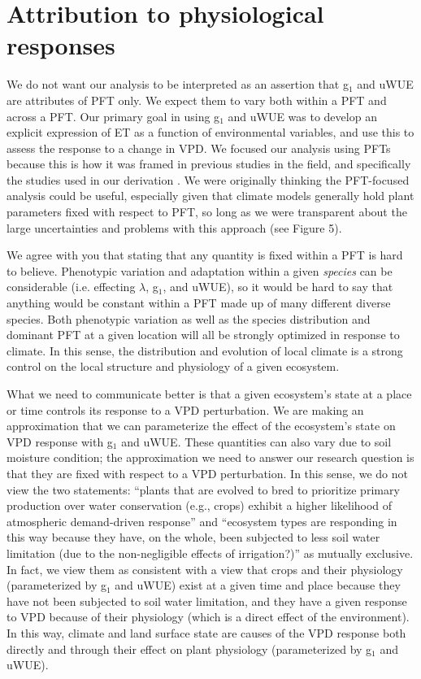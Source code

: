 \documentclass[12pt]{article}
\begin{document}
\section{Attribution to physiological responses}

We do not want our analysis to be interpreted as an assertion that
g$_1$ and uWUE are attributes of PFT only. We expect them to vary both
within a PFT and across a PFT. Our primary goal in using g$_1$ and
uWUE was to develop an explicit expression of ET as a function of
environmental variables, and use this to assess the response to a
change in VPD. We focused our analysis using PFTs because this is how
it was framed in previous studies in the field, and specifically the
studies used in our derivation \citep{Zhou_2014, Zhou_2015,
  Medlyn_2017}. We were originally thinking the PFT-focused analysis
could be useful, especially given that climate models generally hold
plant parameters fixed with respect to PFT, so long as we were
transparent about the large uncertainties and problems with this
approach (see Figure 5).

We agree with you that stating that any quantity is fixed within a PFT
is hard to believe. Phenotypic variation and adaptation within a given
\textit{species} can be considerable (i.e. effecting $\lambda$, g$_1$,
and uWUE), so it would be hard to say that anything would be constant
within a PFT made up of many different diverse species. Both
phenotypic variation as well as the species distribution and dominant
PFT at a given location will all be strongly optimized in response to
climate. In this sense, the distribution and evolution of local
climate is a strong control on the local structure and physiology of a
given ecosystem.

What we need to communicate better is that a given ecosystem's state
at a place or time controls its response to a VPD perturbation. We are
making an approximation that we can parameterize the effect of the
ecosystem's state on VPD response with g$_1$ and uWUE. These quantities
can also vary due to soil moisture condition; the approximation we
need to answer our research question is that they are fixed
with respect to a VPD perturbation. In this sense, we do not view the
two statements: ``plants that are evolved to bred to prioritize
primary production over water conservation (e.g., crops) exhibit a
higher likelihood of atmospheric demand-driven response'' and
``ecosystem types are responding in this way because they have, on the
whole, been subjected to less soil water limitation (due to the
non-negligible effects of irrigation?)'' as mutually exclusive. In
fact, we view them as consistent with a view that crops and their
physiology (parameterized by g$_1$ and uWUE) exist at a given time and
place because they have not been subjected to soil water limitation,
and they have a given response to VPD because of their physiology
(which is a direct effect of the environment). In this way, climate
and land surface state are causes of the VPD response both directly
and through their effect on plant physiology (parameterized by g$_1$
and uWUE).
\end{document}
